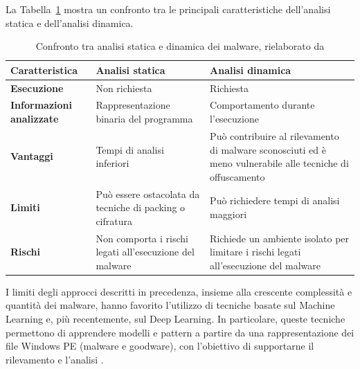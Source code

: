 La Tabella~\ref{tab:static_dynamic_analysis} mostra
un confronto tra le principali caratteristiche dell'analisi statica
e dell'analisi dinamica.

\begin{table}[!ht]
    \centering
    \caption{Confronto tra analisi statica e dinamica dei malware,
    rielaborato da \cite{mutithu2026}}
    \label{tab:static_dynamic_analysis}
    \renewcommand{\arraystretch}{1.3}
    \begin{tabularx}{\textwidth}{
        >{\raggedright\arraybackslash\bfseries}p{}
        >{\raggedright\arraybackslash}X
        >{\raggedright\arraybackslash}X
    }
        \toprule
        \textbf{Caratteristica} &
        \textbf{Analisi statica} &
        \textbf{Analisi dinamica} \\
        \midrule

        Esecuzione &
        Non richiesta &
        Richiesta \\

        \addlinespace
        Informazioni analizzate &
        Rappresentazione binaria del programma &
        Comportamento durante l'esecuzione \\

        \addlinespace
        Vantaggi &
        Tempi di analisi inferiori &
        Può contribuire al rilevamento di malware sconosciuti ed è
        meno vulnerabile alle tecniche di offuscamento \\

        \addlinespace
        Limiti &
        Può essere ostacolata da tecniche di packing o cifratura &
        Può richiedere tempi di analisi maggiori \\

        \addlinespace
        Rischi &
        Non comporta i rischi legati all'esecuzione del malware &
        Richiede un ambiente isolato per limitare i rischi legati
        all'esecuzione del malware \\

        \bottomrule
    \end{tabularx}
\end{table}

I limiti degli approcci descritti in precedenza, insieme alla crescente
complessità e quantità dei malware, hanno favorito l'utilizzo di tecniche
basate sul Machine Learning e, più recentemente, sul Deep
Learning. In particolare, queste tecniche permettono di apprendere
modelli e pattern a partire da una rappresentazione dei
file Windows PE (malware e goodware), con l'obiettivo di supportarne il
rilevamento e l'analisi \cite{ucci2019}.